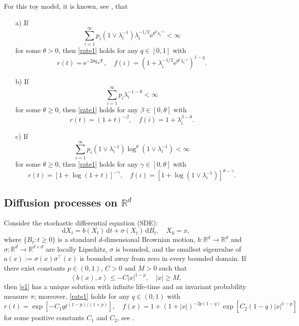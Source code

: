 \documentclass{aptpub}
\newcommand\R{\mathds R}
\newcommand\dup{\mathrm{d}}
\newcommand\eup{\mathrm{e}}                                %
\numberwithin{equation}{section}
\begin{document}
For this toy model, it is known,
see \cite[(the proofs of) Propositions 12 and 14]{for05}, that
\begin{enumerate}
\item[a)]
    If
    $$
        \sum_{i=1}^{\infty}p_i\left(1\vee\lambda_i^{-1} \right)\lambda_i^{-1/2}\eup^{\theta^2\lambda_i^{-1}} <\infty
    $$
    for some $\theta>0$, then \eqref{rate1} holds for any $q\in[0,1]$ with
    $$
        r(t)=\eup^{-2\theta q \sqrt{t}},\quad f(i)= \left(1+\lambda_i^{-1/2}\eup^{\theta^2\lambda_i^{-1}} \right)^{1-q}.
    $$

\item[b)]
    If
    $$
        \sum_{i=1}^{\infty}p_i\lambda_i^{-1-\theta}<\infty
    $$
    for some $\theta\geq0$, then \eqref{rate1} holds for any $\beta\in[0,\theta]$ with
    $$
        r(t)=(1+t)^{-\beta},\quad f(i)=1+\lambda_i^{\beta-\theta}.
    $$

\item[c)]
    If
    $$
        \sum_{i=1}^{\infty}p_i\left( 1\vee\lambda_i^{-1}\right)\log^{\theta}\left( 1\vee\lambda_i^{-1}\right)<\infty
    $$
    for some $\theta\geq0$, then \eqref{rate1} holds for any $\gamma\in[0,\theta]$ with
    $$
        r(t)=\left[1+\log(1+t)\right]^{-\gamma},\quad f(i)=\left[1+\log\left(1\vee\lambda_i^{-1} \right)\right]^{\theta-\gamma}.
    $$
\end{enumerate}


\subsection{Diffusion processes on $\R^d$}

Consider the stochastic differential equation (SDE):
\begin{equation}\label{e1}
    \dup X_t = b(X_t)\,\dup t+\sigma(X_t)\,\dup B_t,
    \quad X_0=x,
\end{equation}
where $\{B_t:t\geq0\}$ is a standard $d$-dimensional Brownian motion, $b:\R^d\to\R^d$ and $\sigma:\R^d\to\R^{d\times d}$ are locally Lipschitz, $\sigma$ is bounded, and the smallest eigenvalue of $a(x):=\sigma(x)\sigma^\top(x)$ is bounded away from zero in every bounded domain. If there exist constants $p\in(0,1)$, $C>0$ and $M>0$ such that
$$
    \left\langle b(x), x\right\rangle\leq-C|x|^{1-p},\quad |x|\geq M,
$$
then \eqref{e1} has a unique solution with infinite life-time and an invariant probability measure $\pi$; moreover, \eqref{rate1} holds for any $q\in(0,1)$ with
$$
    r(t)
    = \exp\left[-C_1qt^{(1-p)/(1+p)} \right],
    \quad
    f(x)
    = 1+(1+|x|)^{-2p(1-q)}\exp\left[C_2(1-q)|x|^{1-p}\right]
$$
for some positive constants $C_1$ and $C_2$, see \cite[Theorem 5.4]{dou09}.
\end{document}
